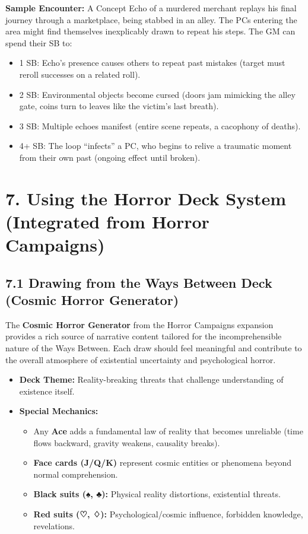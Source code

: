 \documentclass[11pt]{article}
\begin{document}
\textbf{Sample Encounter:} A Concept Echo of a murdered merchant replays his final journey through a marketplace, being stabbed in an alley. The PCs entering the area might find themselves inexplicably drawn to repeat his steps. The GM can spend their SB to:
\begin{itemize}
\item 1 SB: Echo's presence causes others to repeat past mistakes (target must reroll successes on a related roll).
\item 2 SB: Environmental objects become cursed (doors jam mimicking the alley gate, coins turn to leaves like the victim's last breath).
\item 3 SB: Multiple echoes manifest (entire scene repeats, a cacophony of deaths).
\item 4+ SB: The loop ``infects'' a PC, who begins to relive a traumatic moment from their own past (ongoing effect until broken).
\end{itemize}

\clearpage

\section*{7. Using the Horror Deck System (Integrated from Horror Campaigns)}

\subsection*{7.1 Drawing from the Ways Between Deck (Cosmic Horror Generator)}

The \textbf{Cosmic Horror Generator} from the Horror Campaigns expansion provides a rich source of narrative content tailored for the incomprehensible nature of the Ways Between. Each draw should feel meaningful and contribute to the overall atmosphere of existential uncertainty and psychological horror.

\begin{itemize}
\item \textbf{Deck Theme:} Reality-breaking threats that challenge understanding of existence itself.
\item \textbf{Special Mechanics:}
\begin{itemize}
\item Any \textbf{Ace} adds a fundamental law of reality that becomes unreliable (time flows backward, gravity weakens, causality breaks).
\item \textbf{Face cards (J/Q/K)} represent cosmic entities or phenomena beyond normal comprehension.
\item \textbf{Black suits (♠, ♣):} Physical reality distortions, existential threats.
\item \textbf{Red suits (♡, ♢):} Psychological/cosmic influence, forbidden knowledge, revelations.
\end{itemize}
\end{itemize}
\end{document}
